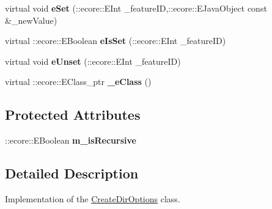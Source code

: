 \begin{DoxyCompactItemize}
\item 
\hypertarget{classFMS__Data_1_1CreateDirOptions_a9de366bd3f8e1f9f9ecf934ebbb600ae}{
virtual void {\bfseries eSet} (::ecore::EInt \_\-featureID,::ecore::EJavaObject const \&\_\-newValue)}
\label{classFMS__Data_1_1CreateDirOptions_a9de366bd3f8e1f9f9ecf934ebbb600ae}

\item 
\hypertarget{classFMS__Data_1_1CreateDirOptions_aeb94b85b9e6bf34baf6bb09b177b5a28}{
virtual ::ecore::EBoolean {\bfseries eIsSet} (::ecore::EInt \_\-featureID)}
\label{classFMS__Data_1_1CreateDirOptions_aeb94b85b9e6bf34baf6bb09b177b5a28}

\item 
\hypertarget{classFMS__Data_1_1CreateDirOptions_a715f0f829126e708d822356dcbf28297}{
virtual void {\bfseries eUnset} (::ecore::EInt \_\-featureID)}
\label{classFMS__Data_1_1CreateDirOptions_a715f0f829126e708d822356dcbf28297}

\item 
\hypertarget{classFMS__Data_1_1CreateDirOptions_abd0c38d4d9967c04a1d8af3d24b22d29}{
virtual ::ecore::EClass\_\-ptr {\bfseries \_\-eClass} ()}
\label{classFMS__Data_1_1CreateDirOptions_abd0c38d4d9967c04a1d8af3d24b22d29}

\end{DoxyCompactItemize}
\subsection*{Protected Attributes}
\begin{DoxyCompactItemize}
\item 
\hypertarget{classFMS__Data_1_1CreateDirOptions_a92a1341f211dd759f81d53652ee1ef4b}{
::ecore::EBoolean {\bfseries m\_\-isRecursive}}
\label{classFMS__Data_1_1CreateDirOptions_a92a1341f211dd759f81d53652ee1ef4b}

\end{DoxyCompactItemize}


\subsection{Detailed Description}
Implementation of the \hyperlink{classFMS__Data_1_1CreateDirOptions}{CreateDirOptions} class. 


